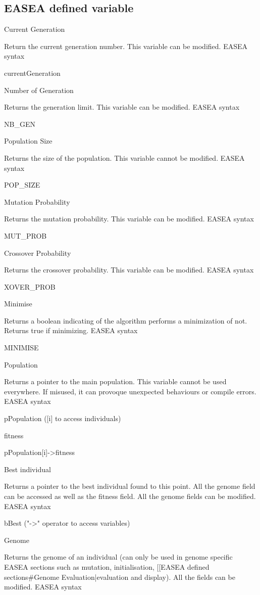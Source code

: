 \documentclass{article}
\begin{document}
\subsection{EASEA defined variable} %
\label{sub:EASEA defined variable}
Current Generation

Return the current generation number. This variable can be modified.
EASEA syntax

currentGeneration

Number of Generation

Returns the generation limit. This variable can be modified.
EASEA syntax

NB_GEN

Population Size

Returns the size of the population. This variable cannot be modified.
EASEA syntax

POP_SIZE

Mutation Probability

Returns the mutation probability. This variable can be modified.
EASEA syntax

MUT_PROB

Crossover Probability

Returns the crossover probability. This variable can be modified.
EASEA syntax

XOVER_PROB

Minimise

Returns a boolean indicating of the algorithm performs a minimization of not. Returns true if minimizing.
EASEA syntax

MINIMISE

Population

Returns a pointer to the main population. This variable cannot be used everywhere. If misused, it can provoque unexpected behaviours or compile errors.
EASEA syntax

pPopulation ([i] to access individuals)

fitness

pPopulation[i]->fitness

Best individual

Returns a pointer to the best individual found to this point. All the genome field can be accessed as well as the fitness field. All the genome fields can be modified.
EASEA syntax

bBest ("->" operator to access variables)

Genome

Returns the genome of an individual (can only be used in genome specific EASEA sections such as mutation, initialisation, [[EASEA defined sections#Genome Evaluation|evaluation and display). All the fields can be modified.
EASEA syntax
\end{document}
